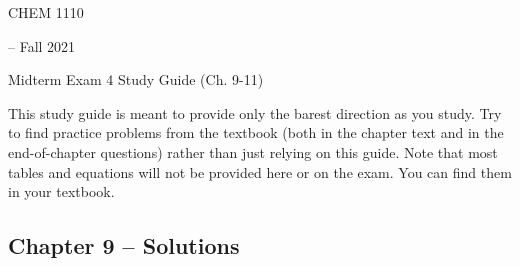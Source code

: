\documentclass[12pt, letterpaper]{memoir}
\begin{document}
	\mainmatter
	
	\begin{center}
		{\Huge CHEM 1110}
		{\LARGE-- Fall 2021
		
		Midterm Exam 4 Study Guide (Ch. 9-11)}
	\end{center}
	
	This study guide is meant to provide only the barest direction as you study. Try to find practice problems from the textbook (both in the chapter text and in the end-of-chapter questions) rather than just relying on this guide. Note that most tables and equations will not be provided here or on the exam. You can find them in your textbook. 
	
	\subsection*{Chapter 9 --  Solutions}
\end{document}
